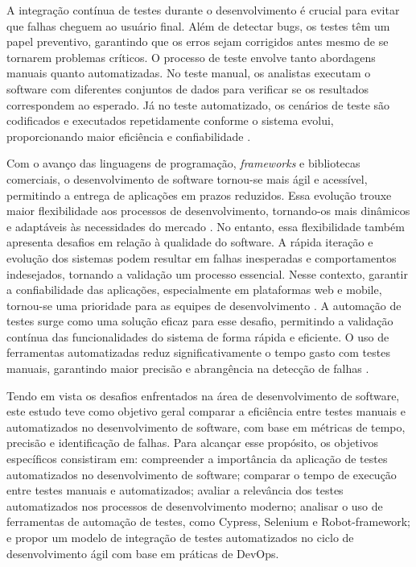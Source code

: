 \documentclass{UNESC}
\begin{document}
A integração contínua de testes durante o desenvolvimento é crucial para evitar que falhas cheguem ao usuário final. Além de detectar bugs, os testes têm um papel preventivo, garantindo que os erros sejam corrigidos antes mesmo de se tornarem problemas críticos. O processo de teste envolve tanto abordagens manuais quanto automatizadas. No teste manual, os analistas executam o software com diferentes conjuntos de dados para verificar se os resultados correspondem ao esperado. Já no teste automatizado, os cenários de teste são codificados e executados repetidamente conforme o sistema evolui, proporcionando maior eficiência e confiabilidade \cite{SOMMERVILE}.

Com o avanço das linguagens de programação, \textit{frameworks} e bibliotecas comerciais, o desenvolvimento de software tornou-se mais ágil e acessível, permitindo a entrega de aplicações em prazos reduzidos. Essa evolução trouxe maior flexibilidade aos processos de desenvolvimento, tornando-os mais dinâmicos e adaptáveis às necessidades do mercado \cite{souza_automacao_2023}. No entanto, essa flexibilidade também apresenta desafios em relação à qualidade do software. A rápida iteração e evolução dos sistemas podem resultar em falhas inesperadas e comportamentos indesejados, tornando a validação um processo essencial. Nesse contexto, garantir a confiabilidade das aplicações, especialmente em plataformas web e mobile, tornou-se uma prioridade para as equipes de desenvolvimento \cite{souza_automacao_2023}. A automação de testes surge como uma solução eficaz para esse desafio, permitindo a validação contínua das funcionalidades do sistema de forma rápida e eficiente. O uso de ferramentas automatizadas reduz significativamente o tempo gasto com testes manuais, garantindo maior precisão e abrangência na detecção de falhas \cite{gandini2002}.

Tendo em vista os desafios enfrentados na área de desenvolvimento de software, este estudo teve como objetivo geral comparar a eficiência entre testes manuais e automatizados no desenvolvimento de software, com base em métricas de tempo, precisão e identificação de falhas. Para alcançar esse propósito, os objetivos específicos consistiram em: compreender a importância da aplicação de testes automatizados no desenvolvimento de software; comparar o tempo de execução entre testes manuais e automatizados; avaliar a relevância dos testes automatizados nos processos de desenvolvimento moderno; analisar o uso de ferramentas de automação de testes, como Cypress, Selenium e Robot-framework; e propor um modelo de integração de testes automatizados no ciclo de desenvolvimento ágil com base em práticas de DevOps.
\end{document}
